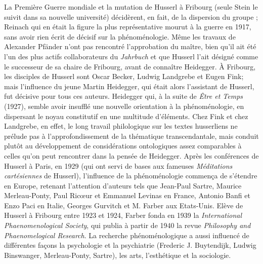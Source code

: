 La Première Guerre mondiale et la
mutation de Husserl à Fribourg (seule
Stein le suivit dans sa nouvelle université)
décidèrent, en fait, de la dispersion du
groupe ; Reinach qui en était la figure la
plus représentative mourut à la guerre en
1917, sans avoir rien écrit de décisif sur
la phénoménologie. Même les travaux de
Alexander Pfänder n’ont pas rencontré
l'approbation du maître, bien qu'il ait été
l'un des plus actifs collaborateurs du {\it Jahrbuch}
et que Husserl l’ait désigné comme
le successeur de sa chaire de Fribourg,
avant de connaître Heidegger. À Fribourg,
les disciples de Husserl sont Oscar
Becker, Ludwig Landgrebe et Eugen
Fink; mais l'influence du jeune Martin
Heidegger, qui était alors l'assistant de
Husserl, fut décisive pour tous ces
auteurs. Heidegger qui, à la suite de {\it Être
et Temps} (1927), semble avoir insufflé une
nouvelle orientation à la phénoménologie,
en dispersant le noyau constitutif en
une multitude d’éléments. Chez Fink et
chez Landgrebe, en effet, le long travail
philologique sur les textes husserliens ne
prélude pas à l’approfondissement de la
thématique transcendantale, mais conduit
plutôt au développement de considérations
ontologiques assez comparables à
celles qu’on peut rencontrer dans la pensée
de Heidegger. Après les conférences
de Husserl à Paris, en 1929 (qui ont servi
de bases aux fameuses {\it Méditations cartésiennes}
de Husserl), l'influence de la phénoménologie
commença de s'étendre en
Europe, retenant l'attention d’auteurs tels
que Jean-Paul Sartre, Maurice Merleau-Ponty,
Paul Ricœur et Emmanuel Levinas
en France, Antonio Banfi et Enzo Paci en
Italie, Georges Gurvitch et M. Farber aux
Etats-Unis. Elève de Husserl à Fribourg
entre 1923 et 1924, Farber fonda en 1939
la {\it International Phaenomenological Society},
qui publia à partir de 1940 la revue {\it Philosophy
and Phaenomelogical Research}.
La recherche phénoménologique a aussi
influencé de différentes façons la psychologie
et la psychiatrie (Frederic J. Buytendijk,
Ludwig Binswanger, Merleau-Ponty,
Sartre), les arts, l'esthétique et la sociologie.


